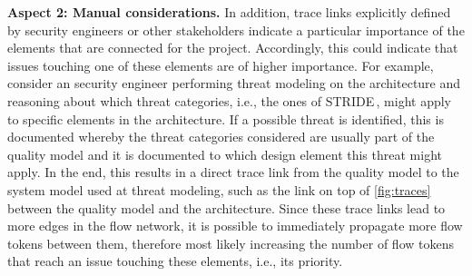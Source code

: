 	\textbf{Aspect 2: Manual considerations.} In addition, trace links explicitly defined by security engineers or other stakeholders indicate a particular importance of the elements that are connected for the project.
	Accordingly, this could indicate that issues touching one of these elements are of higher importance.
	For example, consider an security engineer performing threat modeling on the architecture and reasoning about which threat categories, i.e., the ones of STRIDE\,\cite{STRIDE,Shostack2008}, might apply to specific elements in the architecture.
	If a possible threat is identified, this is documented whereby the threat categories considered are usually part of the quality model and it is documented to which design element this threat might apply.
	In the end, this results in a direct trace link from the quality model to the system model used at threat modeling, such as the link on top of \autoref{fig:traces} between the quality model and the architecture.
	Since these trace links lead to more edges in the flow network, it is possible to immediately propagate more flow tokens between them, therefore most likely increasing the number of flow tokens that reach an issue touching these elements, i.e., its priority.


